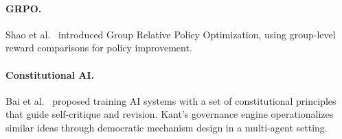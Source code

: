 \paragraph{GRPO.}
Shao et al.~\citep{shao2024deepseekmath} introduced Group Relative Policy
Optimization, using group-level reward comparisons for policy improvement.

\paragraph{Constitutional AI.}
Bai et al.~\citep{bai2022constitutional} proposed training AI systems
with a set of constitutional principles that guide self-critique and
revision. Kant's governance engine operationalizes similar ideas through
democratic mechanism design in a multi-agent setting.
